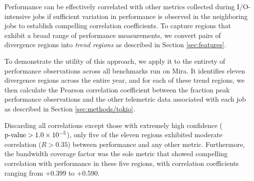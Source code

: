 
Performance can be effectively correlated with other metrics collected during I/O-intensive jobs if sufficient variation in performance is observed in the neighboring jobs to establish compelling correlation coefficients.
To capture regions that exhibit a broad range of performance measurements, we convert pairs of divergence regions into \emph{trend regions} as described in Section \ref{sec:features}.

%
%

To demonstrate the utility of this approach, we apply it to the entirety of performance observations across all benchmarks run on Mira.
It identifies eleven divergence regions across the entire year, and for each of these trend regions, we then calculate the Pearson correlation coefficient between the fraction peak performance observations and the other telemetric data associated with each job as described in Section \ref{sec:methods/tokio}.

Discarding all correlations except those with extremely high confidence ($\textup{p-value} > {1.0 \times 10^{-5}}$), only five of the eleven regions exhibited moderate correlation ($R > 0.35$) between performance and any other metric.
Furthermore, the bandwidth coverage factor was the sole metric that showed compelling correlation with performance in these five regions, with correlation coefficients ranging from +0.399 to +0.590.

